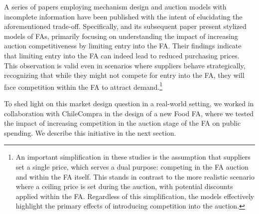 {A series of papers employing mechanism design and auction models with incomplete information have been published with the intent of elucidating the aforementioned trade-off. Specifically, \cite{saban2021procurement} and its subsequent paper \cite{Choi22} present stylized models of FAs, primarily focusing on understanding the impact of increasing auction competitiveness by limiting entry into the FA. Their findings indicate that limiting entry into the FA can indeed lead to reduced purchasing prices. This observation is valid even in scenarios where suppliers behave strategically, recognizing that while they might not compete for entry into the FA, they will face competition within the FA to attract demand.}\footnote{{An important simplification in these studies is the assumption that suppliers set a single price, which serves a dual purpose: competing in the FA auction and within the FA itself. This stands in contrast to the more realistic scenario where a ceiling price is set during the auction, with potential discounts applied within the FA. Regardless of this simplification, the models effectively highlight the primary effects of introducing competition into the auction.}}


To shed light on this market design question in a real-world setting, we worked in collaboration with ChileCompra in the design of a new Food FA, where we tested the impact of increasing competition in the auction stage of the FA on public spending. We describe this initiative in the next section.







%


 



